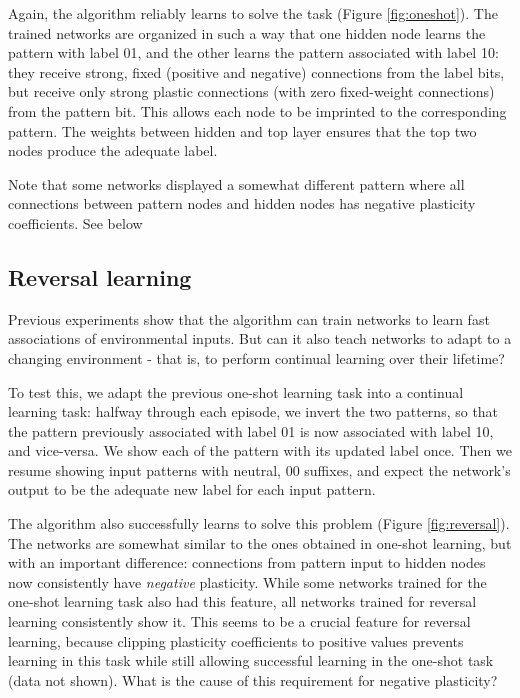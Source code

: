 \documentclass{article}
\begin{document}
Again, the algorithm reliably learns to solve the task (Figure
\ref{fig:oneshot}). The trained networks are
organized in such a way that one hidden node learns the pattern with label 01,
and the other learns the pattern associated with label 10: they receive strong,
fixed (positive and negative) connections from the label bits, but receive only
strong plastic connections (with zero fixed-weight connections) from the pattern
bit. This allows each node to be imprinted to the corresponding pattern. The weights between hidden and top layer ensures that the top two nodes
produce the adequate label.

Note that some networks displayed a somewhat different pattern where all
connections between pattern nodes and hidden nodes has negative plasticity
coefficients. See below

\subsection{Reversal learning}

Previous experiments show that the algorithm can train networks to learn fast
associations of environmental inputs. But can it also teach networks to adapt to
a changing environment - that is, to perform continual learning over their
lifetime? 

To test this, we adapt the previous one-shot learning task into a
continual learning task: halfway through each episode, we invert the two
patterns, so that the pattern previously associated with label 01 is now
associated with label 10, and vice-versa. We show each of the pattern with its
updated label once. Then we resume showing input patterns with neutral, 00
suffixes, and expect the network's output to be the adequate new label for
each input pattern.


The algorithm also successfully learns to solve this problem (Figure
\ref{fig:reversal}). The networks are somewhat similar to the ones obtained in
one-shot
learning, but with an important difference: connections from pattern input
to hidden nodes now consistently have \emph{negative} plasticity. While some
networks trained for the one-shot learning task also had this feature,
all networks trained  for reversal learning consistently show it. This seems to
be a crucial feature for reversal learning, because clipping plasticity coefficients to positive values
prevents learning in this task while still allowing successful learning in the
one-shot task (data not shown). What is the cause of this requirement for
negative plasticity? 
\end{document}
